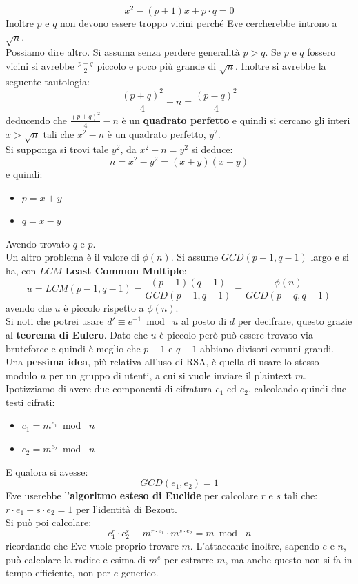 \documentclass[a4paper,12pt, oneside]{book}
\begin{document}
\[x^2-(p+1)x+p\cdot q=0\]
Inoltre $p$ e $q$ non devono essere troppo vicini perché Eve cercherebbe introno
a $\sqrt{n}$.\\
Possiamo dire altro. Si assuma senza perdere generalità $p>q$. Se $p$ e $q$
fossero vicini si avrebbe $\frac{p-q}{2}$ piccolo e poco più grande di
$\sqrt{n}$. Inoltre si avrebbe la seguente tautologia:
\[\frac{(p+q)^2}{4}-n=\frac{(p-q)^2}{4}\]
deducendo che $\frac{(p+q)^2}{4}-n$ è un \textbf{quadrato perfetto} e quindi si
cercano gli interi $x> \sqrt{n}$ tali che $x^2-n$ è un quadrato perfetto,
$y^2$.\\
Si supponga si trovi tale $y^2$, da $x^2-n=y^2$ si deduce:
\[n=x^2-y^2=(x+y)(x-y)\]
e quindi:
\begin{itemize}
  \item $p=x+y$
  \item $q=x-y$
\end{itemize}
Avendo trovato $q$ e $p$.\\
Un altro problema è il valore di $\phi(n)$. 
Si assume $GCD(p-1,q-1)$ largo e si ha, con $LCM$ \textbf{Least Common
  Multiple}: 
\[u=LCM(p-1,q-1)=\frac{(p-1)(q-1)}{GCD(p-1,q-1)}=\frac{\phi(n)}{GCD(p-q,q-1)}\]
avendo che $u$ è piccolo rispetto a $\phi(n)$.\\
Si noti che potrei usare $d'\equiv e^{-1}\bmod \,\,u$ al posto di $d$ per
decifrare, questo grazie al \textbf{teorema di Eulero}. Dato che $u$ è piccolo
però può essere trovato via bruteforce e quindi è meglio che $p-1$ e $q-1$
abbiano divisori comuni grandi.\\
Una \textbf{pessima idea}, più relativa all'uso di RSA, è quella di usare lo
stesso modulo $n$ per un gruppo 
di utenti, a cui si vuole inviare il plaintext $m$. Ipotizziamo di avere due
componenti di cifratura $e_1$ ed $e_2$, calcolando quindi due testi cifrati:
\begin{itemize}
  \item $c_1=m^{e_1}\bmod \,\,n$
  \item $c_2=m^{e_2}\bmod \,\,n$
\end{itemize}
E qualora si avesse:
\[GCD(e_1,e_2)=1\]
Eve userebbe l'\textbf{algoritmo esteso di Euclide} per calcolare $r$ e $s$ tali
che:
$r\cdot e_1+s\cdot e_2=1$
per l'identità di Bezout.\\
Si può poi calcolare:
\[c_1^r\cdot c_2^s\equiv m^{r\cdot e_1}\cdot m^{s\cdot e_2}=m\bmod \,\,n\]
ricordando che Eve vuole proprio trovare $m$. L'attaccante inoltre, sapendo $e$
e $n$, può calcolare la radice e-esima di $m^e$ per estrarre $m$, ma anche
questo non si fa in tempo efficiente, non per $e$ generico.\\
\end{document}

